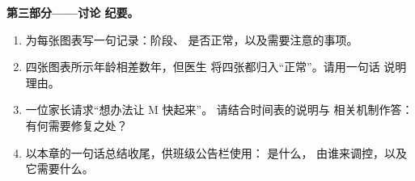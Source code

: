 \begin{problem}
\medskip\noindent\textbf{第三部分——讨论
纪要。}
\begin{enumerate}[resume]
  \item 为每张图表写一句记录：阶段、
        是否正常，以及需要注意的事项。
  \item 四张图表所示年龄相差数年，但医生
        将四张都归入“正常”。请用一句话
        说明理由。
  \item 一位家长请求“想办法让 M 快起来”。
        请结合时间表的说明与
        相关机制作答：有何需要修复之处？
  \item 以本章的一句话总结收尾，供班级公告栏使用：
        是什么，
        由谁来调控，以及它需要什么。
\end{enumerate}
\end{problem}
